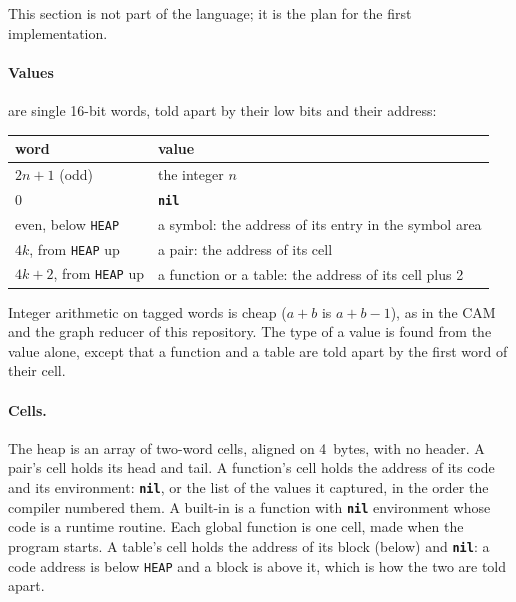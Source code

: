 \documentclass[11pt,a4paper]{article}
\newcommand{\kw}[1]{\textbf{\texttt{#1}}}
\begin{document}
This section is not part of the language; it is the plan for the first
implementation.

\paragraph{Values} are single 16-bit words, told apart by their low bits and
their address:
\begin{center}
\small
\begin{tabular}{@{}l l@{}}
\toprule
word & value\\
\midrule
$2n+1$ (odd) & the integer $n$\\
0 & \kw{nil}\\
even, below \texttt{HEAP} & a symbol: the address of its entry in the symbol area\\
$4k$, from \texttt{HEAP} up & a pair: the address of its cell\\
$4k+2$, from \texttt{HEAP} up & a function or a table: the address of its cell plus 2\\
\bottomrule
\end{tabular}
\end{center}
Integer arithmetic on tagged words is cheap ($a+b$ is $a+b-1$), as in the CAM
and the graph reducer of this repository. The type of a value is found from
the value alone, except that a function and a table are told apart by the
first word of their cell.

\paragraph{Cells.} The heap is an array of two-word cells, aligned on
4~bytes, with no header. A pair's cell holds its head and tail. A function's
cell holds the address of its code and its environment: \kw{nil}, or the list
of the values it captured, in the order the compiler numbered them. A built-in
is a function with \kw{nil} environment whose code is a runtime routine. Each
global function is one cell, made when the program starts. A table's cell
holds the address of its block (below) and \kw{nil}: a code address is
below \texttt{HEAP} and a block is above it, which is how the two are told
apart.
\end{document}
